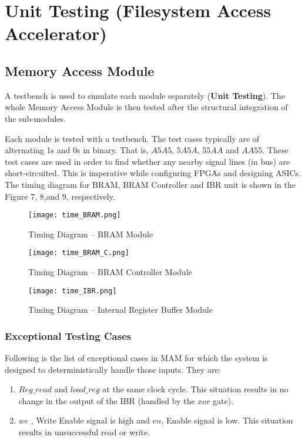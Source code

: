 \section{Unit Testing (Filesystem Access Accelerator)}

\subsection{Memory Access Module}
A testbench is used to simulate each module separately (\textbf{Unit Testing}). The whole Memory Access Module is then tested after the structural integration of the sub-modules.

Each module is tested with a testbench. The test cases typically are of alternating 1s and 0s in binary. That is, $A5A5$, $5A5A$, $55AA$ and $AA55$. These test cases are used in order to find whether any nearby signal lines (in bus) are short-circuited. This is imperative while configuring FPGAs and designing ASICs. The timing diagram for BRAM, BRAM Controller and IBR unit is shown in the Figure%
 7, 8,and 9, respectively.

\begin{figure}[!ht]
	\centering
	\texttt{[image: time\_BRAM.png]}
		\caption{ Timing Diagram -- BRAM Module}
		\label{fig:time_BRAM}
\end{figure}

\begin{figure}[!ht]
	\centering
	\texttt{[image: time\_BRAM\_C.png]}
		\caption{ Timing Diagram -- BRAM Controller Module}
		\label{fig:time_BRAM_C}
\end{figure}

\begin{figure}[!ht]
	\centering
	\texttt{[image: time\_IBR.png]}
		\caption{ Timing Diagram -- Internal Register Buffer Module}
		\label{fig:time_IBR}
\end{figure}


\subsubsection{Exceptional Testing Cases}

Following is the list of exceptional cases in MAM for which the system is designed to deterministically handle those inputs. They are:
\begin{enumerate}
 \item $Reg\_read$ and $load\_reg$ at the same clock cycle. This situation results in no change in the output of the IBR (handled by the $xor$ gate).
 \item $we$ , Write Enable signal is high and $en$, Enable signal is low. This situation results in unsuccessful read or write.
\end{enumerate}



